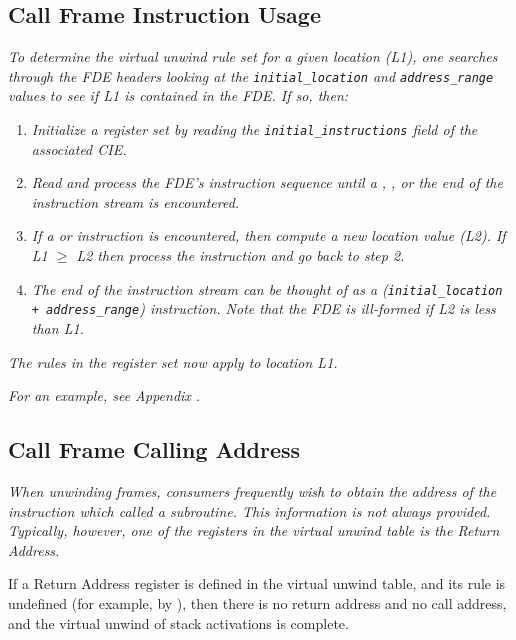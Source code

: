 \subsection{Call Frame Instruction Usage} 
\label{chap:callframeinstructionusage}

\textit{To determine the virtual unwind rule set for a given location
(L1), one searches through the FDE headers looking at the
\texttt{initial\_location} and \texttt{address\_range} values to see if L1 is
contained in the FDE. If so, then:}
\begin{enumerate}[1. ]

\item \textit{Initialize a register set by reading the
\texttt{initial\_instructions} field of the associated CIE.}

\item \textit{Read and process the FDE\textquoteright s instruction
sequence until a \DWCFAadvanceloc, 
\DWCFAsetloc, or the
end of the instruction stream is encountered.}

\item \textit{ If a \DWCFAadvanceloc{} or \DWCFAsetloc{}
instruction is encountered, then compute a new location value
(L2). If L1 $\geq$ L2 then process the instruction and go back
to step 2.}

\item \textit{ The end of the instruction stream can be thought
of as a \DWCFAsetloc{} (\texttt{initial\_location + address\_range})
instruction. Note that the FDE is ill-formed if L2 is less
than L1.}

\end{enumerate}

\textit{The rules in the register set now apply to location L1.}

\textit{For an example, see 
Appendix .}



\subsection{Call Frame Calling Address}
\label{chap:callframecallingaddress}

\textit{When unwinding frames, consumers frequently wish to obtain the
address of the instruction which called a subroutine. This
information is not always provided. Typically, however,
one of the registers in the virtual unwind table is the
Return Address.}

If a Return Address register is defined in the virtual
unwind table, and its rule is undefined (for example, by
\DWCFAundefined), then there is no return address and no
call address, and the virtual unwind of stack activations
is complete.

